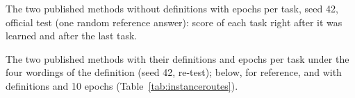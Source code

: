 \begin{table}[t]
  \caption{The two published methods without definitions with \AudFullEpochs{} epochs per task, seed 42, official test (one random reference answer): score of each task right after it was learned and after the last task.}
  \label{tab:noinstfullpertask}
  \centering
  
\end{table}

\begin{table}[t]
  \caption{The two published methods with their definitions and \AudFullEpochs{} epochs per task under the four wordings of the definition (seed 42, re-test); below, for reference, \cert{} and \recog{} with definitions and 10 epochs (Table~\ref{tab:instanceroutes}).}
  \label{tab:fullwordings}
  \centering
  
\end{table}
